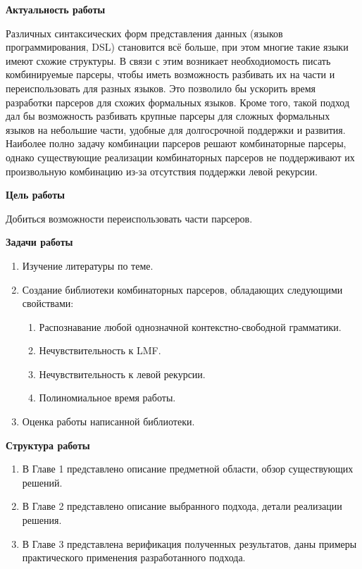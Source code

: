 \documentclass[times]{itmo-student-thesis}
\begin{document}
\tableofcontents

\startprefacepage
\textbf{Актуальность работы}

Различных синтаксических форм представления данных (языков программирования, DSL) становится всё больше, при этом
многие	такие языки имеют схожие структуры. В связи с этим возникает необходиомость писать комбинируемые парсеры, чтобы
иметь возможность разбивать их на части и переиспользовать для разных языков. Это позволило бы ускорить время
разработки парсеров для схожих формальных языков. Кроме того, такой подход дал бы возможность разбивать крупные парсеры
для сложных формальных языков на небольшие части, удобные для долгосрочной поддержки и развития. Наиболее полно задачу
комбинации парсеров решают комбинаторные парсеры, однако существующие реализации комбинаторных парсеров не поддерживают
их произвольную комбинацию из-за отсутствия поддержки левой рекурсии.


\textbf{Цель работы}

Добиться возможности переиспользовать части парсеров.

\textbf{Задачи работы}

\begin{enumerate}
  \item Изучение литературы по теме.
  \item Создание библиотеки комбинаторных парсеров, обладающих следующими свойствами:
    \begin{enumerate}
        \item Распознавание любой однозначной контекстно-свободной грамматики.
        \item Нечувствительность к LMF.
        \item Нечувствительность к левой рекурсии.
        \item Полиномиальное время работы.
    \end{enumerate}
  \item Оценка работы написанной библиотеки.
\end{enumerate}

\textbf{Структура работы}

\begin{enumerate}
    \item В Главе 1 представлено описание предметной области, обзор существующих решений.
    \item В Главе 2 представлено описание выбранного подхода, детали реализации решения.
    \item В Главе 3 представлена верификация полученных результатов, даны примеры практического применения 
    разработанного подхода.
\end{enumerate}
\end{document}
